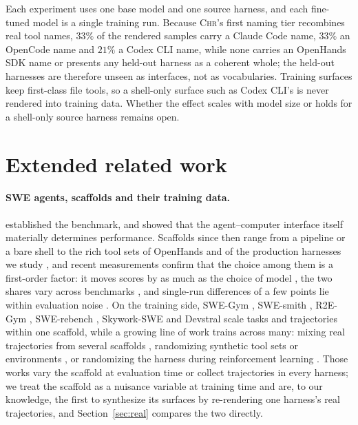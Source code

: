 \documentclass{article} %
\newcommand{\chr}{\textsc{Chr}}
\newcommand{\claudecode}{Claude Code}
\newcommand{\opencode}{OpenCode}
\newcommand{\codexcli}{Codex CLI}
\newcommand{\openhands}{OpenHands SDK}   %
\begin{document}
Each experiment uses one base model and one source harness, and each
fine-tuned model is a single training run. Because \chr{}'s first naming tier
recombines real tool names, $33\%$ of the rendered samples carry a
\claudecode{} name, $33\%$ an \opencode{} name and $21\%$ a \codexcli{} name,
while none carries an \openhands{} name or presents any held-out harness as a
coherent whole; the held-out harnesses are therefore unseen as interfaces, not
as vocabularies. Training surfaces keep first-class file tools, so a shell-only
surface such as \codexcli{}'s is never rendered into training data. Whether the
effect scales with model size or holds for a shell-only source harness
remains open.

\section{Extended related work}
\label{app:related}

\paragraph{SWE agents, scaffolds and their training data.}
\citet{jimenez2024swebench} established the benchmark, and
\citet{yang2024sweagent} showed that the agent--computer interface itself
materially determines performance. Scaffolds since then range from a pipeline
or a bare shell \citep{xia2024agentless,minisweagent2025} to the rich tool sets
of OpenHands \citep{wang2025openhands,wang2025openhandssdk} and of the
production harnesses we study \citep{anthropic2025claudecode,openai2025codex,
opencode2025}, and recent measurements confirm that the choice among them is a
first-order factor: it moves scores by as much as the choice of model
\citep{zhang2026stopcomparing,yao2026harnessbench,zheng2026clawswebench}, the
two shares vary across benchmarks \citep{merrill2026terminalbench}, and
single-run differences of a few points lie within evaluation noise
\citep{bjarnason2026randomness}. On the training side, SWE-Gym
\citep{pan2024swegym}, SWE-smith \citep{yang2025swesmith}, R2E-Gym
\citep{jain2025r2egym}, SWE-rebench
\citep{badertdinov2025swerebench,badertdinov2026swerebenchv2}, Skywork-SWE
\citep{zeng2025skyworkswe} and Devstral \citep{rastogi2025devstral} scale tasks
and trajectories within one scaffold, while a growing line of work trains
across many: mixing real trajectories from several scaffolds
\citep{abadji2026laguna}, randomizing synthetic tool sets or environments
\citep{kimiteam2025k2,chen2026minimaxm2,cao2026qwen3codernext}, or randomizing
the harness during reinforcement learning
\citep{huang2026katcoder,xu2026polar,yu2026openforgerl}. Those works vary the
scaffold at evaluation time or collect trajectories in every harness; we treat
the scaffold as a nuisance variable at training time and are, to our
knowledge, the first to synthesize its surfaces by re-rendering one harness's
real trajectories, and Section~\ref{sec:real} compares the two directly.
\end{document}
